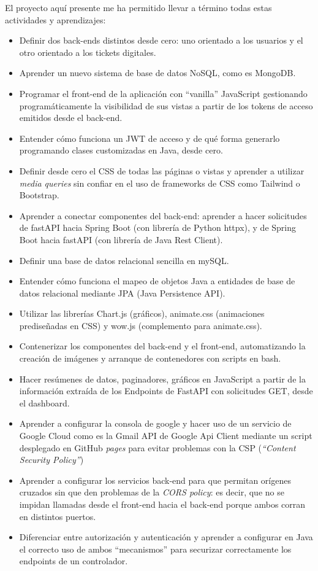 \documentclass[a4paper,12pt]{report}
\begin{document}
	El proyecto aquí presente me ha permitido llevar a término todas estas actividades y aprendizajes: 
	
	\begin{itemize}
		\setlength{\itemsep}{.0em}
		\item Definir dos back-ends distintos desde cero: uno orientado a los usuarios y el otro orientado a los tickets digitales.
		\item Aprender un nuevo sistema de base de datos NoSQL, como es MongoDB.
		\item Programar el front-end de la aplicación con ``vanilla'' JavaScript gestionando programáticamente la  visibilidad de sus vistas a partir de los tokens de acceso emitidos desde el back-end.
		\item Entender cómo funciona un JWT de acceso y de qué forma generarlo programando clases customizadas en Java, desde cero.
		\item Definir desde cero el CSS de todas las páginas o vistas y aprender a utilizar \textit{media queries} sin confiar en el uso de frameworks de CSS como Tailwind o Bootstrap.
		\item Aprender a conectar componentes del back-end: aprender a hacer solicitudes de fastAPI hacia Spring Boot (con librería de Python httpx), y de Spring Boot hacia fastAPI (con librería de Java Rest Client).
		\item Definir una base de datos relacional sencilla en mySQL.
		\item Entender cómo funciona el mapeo de objetos Java a entidades de base de datos relacional mediante JPA (Java Persistence API).
		\item Utilizar las librerías Chart.js (gráficos), animate.css (animaciones prediseñadas en CSS) y wow.js (complemento para animate.css).
		\item Contenerizar los componentes del back-end y el front-end, automatizando la creación de imágenes y arranque de contenedores con scripts en bash.
		\item Hacer resúmenes de datos, paginadores, gráficos en JavaScript a partir de la información extraída de los Endpoints de FastAPI con solicitudes GET, desde el dashboard.
		\item Aprender a configurar la consola de google y hacer uso de un servicio de Google Cloud como es la Gmail API de Google Api Client mediante un script desplegado en GitHub \textit{pages} para evitar problemas con la CSP (\textit{``Content Security Policy''})
		\item Aprender a configurar los servicios back-end para que permitan orígenes cruzados sin que den problemas de la \textit{CORS policy}: es decir, que no se impidan llamadas desde el front-end hacia el back-end porque ambos corran en distintos puertos.
		\item Diferenciar entre autorización y autenticación y aprender a configurar en Java el correcto uso de ambos ``mecanismos'' para securizar correctamente los endpoints de un controlador.
	\end{itemize}
	
\end{document}
